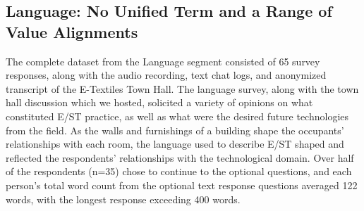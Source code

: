 \documentclass[manuscript,review,anonymous]{acmart}
\begin{document}

\subsection{Language: No Unified Term and a Range of Value Alignments}
The complete dataset from the Language segment consisted of 65 survey responses, along with the audio recording, text chat logs, and anonymized transcript of the E-Textiles Town Hall. 
The language survey, along with the town hall discussion which we hosted, solicited a variety of opinions on what constituted E/ST practice, as well as what were the desired future technologies from the field. As the walls and furnishings of a building shape the occupants' relationships with each room, the language used to describe E/ST shaped and reflected the respondents' relationships with the technological domain.
Over half of the respondents (n=35) chose to continue to the optional questions, and each person's total word count from the optional text response questions averaged 122 words, with the longest response exceeding 400 words. 
\end{document}
